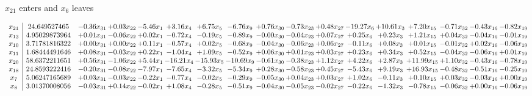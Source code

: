 \documentclass[9pt]{article}
\begin{document}
 $ x_{21} $ enters and $ x_{6} $ leaves 

 \[\begin{array}{c| c c@{\hskip 2pt} c@{\hskip 2pt} c@{\hskip 2pt} c@{\hskip 2pt} c@{\hskip 2pt} c@{\hskip 2pt} c@{\hskip 2pt} c@{\hskip 2pt} c@{\hskip 2pt} c@{\hskip 2pt} c@{\hskip 2pt} c@{\hskip 2pt} c@{\hskip 2pt} c@{\hskip 2pt} c@{\hskip 2pt} }
 x_{21}   &  24.649527465 & -0.36 x_{31} & +  0.03 x_{22} & -5.46 x_{1} & +  3.16 x_{4} & +  6.75 x_{5} & -6.76 x_{9} & +  0.76 x_{30} & -0.73 x_{23} & +  0.48 x_{27} & -19.27 x_{6} & + 10.61 x_{3} & +  7.20 x_{15} & -0.71 x_{32} & -0.43 x_{16} & -0.82 x_{19}\\
 x_{13}   &  4.95029873964 & +  0.01 x_{31} & -0.06 x_{22} & +  0.02 x_{1} & -0.72 x_{4} & -0.19 x_{5} & -0.89 x_{9} & -0.00 x_{30} & -0.04 x_{23} & +  0.07 x_{27} & +  0.25 x_{6} & +  0.23 x_{3} & +  1.21 x_{15} & +  0.04 x_{32} & -0.04 x_{16} & -0.01 x_{19}\\
 x_{10}   &  3.71781816322 & +  0.00 x_{31} & +  0.00 x_{22} & +  0.11 x_{1} & -0.57 x_{4} & +  0.02 x_{5} & -0.68 x_{9} & -0.04 x_{30} & -0.06 x_{23} & +  0.06 x_{27} & -0.11 x_{6} & +  0.08 x_{3} & +  0.01 x_{15} & -0.01 x_{32} & +  0.02 x_{16} & -0.06 x_{19}\\
 x_{11}   &  1.68444491646 & +  0.08 x_{31} & -0.03 x_{22} & +  0.22 x_{1} & -1.04 x_{4} & +  1.09 x_{5} & -0.52 x_{9} & +  0.06 x_{30} & +  0.01 x_{23} & +  0.03 x_{27} & +  0.23 x_{6} & +  0.34 x_{3} & +  0.52 x_{15} & -0.04 x_{32} & -0.06 x_{16} & +  0.01 x_{19}\\
 x_{20}   &  58.6372211651 & +  0.56 x_{31} & -1.06 x_{22} & +  5.44 x_{1} & -16.21 x_{4} & -15.93 x_{5} & -10.69 x_{9} & -0.61 x_{30} & -0.38 x_{23} & +  1.12 x_{27} & +  4.22 x_{6} & +  2.87 x_{3} & + 11.99 x_{15} & +  1.10 x_{32} & -0.43 x_{16} & -0.78 x_{19}\\
 x_{18}   &  24.8593222416 & -0.20 x_{31} & -0.08 x_{22} & -7.97 x_{1} & -7.65 x_{4} & -3.32 x_{5} & -5.34 x_{9} & +  0.28 x_{30} & -0.58 x_{23} & +  0.45 x_{27} & -5.43 x_{6} & +  9.19 x_{3} & + 16.93 x_{15} & -0.48 x_{32} & -0.51 x_{16} & -0.25 x_{19}\\
 x_{7}   &  5.06247165689 & +  0.03 x_{31} & -0.03 x_{22} & -0.22 x_{1} & -0.77 x_{4} & -0.02 x_{5} & -0.29 x_{9} & -0.05 x_{30} & +  0.04 x_{23} & +  0.03 x_{27} & +  1.02 x_{6} & -0.11 x_{3} & +  0.10 x_{15} & +  0.03 x_{32} & -0.03 x_{16} & +  0.00 x_{19}\\
 x_{8}   &  3.01370008056 & -0.03 x_{31} & +  0.14 x_{22} & -0.02 x_{1} & +  1.08 x_{4} & -0.28 x_{5} & -0.51 x_{9} & -0.04 x_{30} & -0.05 x_{23} & -0.02 x_{27} & -0.22 x_{6} & -1.32 x_{3} & -0.78 x_{15} & -0.06 x_{32} & +  0.00 x_{16} & -0.06 x_{19}\\

\end{array}\]
\end{document}
